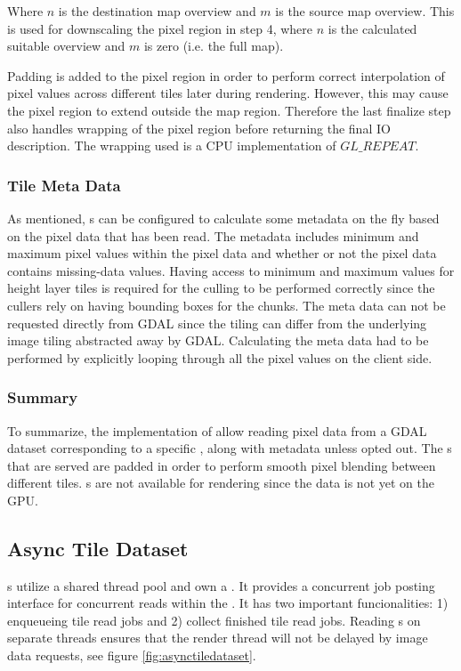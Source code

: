 Where $n$ is the destination map overview and $m$ is the source map overview. This is used for downscaling the pixel region in step 4, where $n$ is the calculated suitable overview and $m$ is zero (i.e. the full map). 

Padding is added to the pixel region in order to perform correct interpolation of pixel values across different tiles later during rendering. However, this may cause the pixel region to extend outside the map region. Therefore the last finalize step also handles wrapping of the pixel region before returning the final IO description. The wrapping used is a CPU implementation of $GL\_REPEAT$.

\subsubsection{Tile Meta Data}
As mentioned, s can be configured to calculate some metadata on the fly based on the pixel data that has been read. The metadata includes minimum and maximum pixel values within the pixel data and whether or not the pixel data contains missing-data values. Having access to minimum and maximum values for height layer tiles is required for the culling to be performed correctly since the cullers rely on having bounding boxes for the chunks. The meta data can not be requested directly from GDAL since the tiling can differ from the underlying image tiling abstracted away by GDAL. Calculating the meta data had to be performed by explicitly looping through all the pixel values on the client side. 

\subsubsection{Summary}
To summarize, the implementation of  allow reading pixel data from a GDAL dataset corresponding to a specific , along with metadata unless opted out. The s that are served are padded in order to perform smooth pixel blending between different tiles. s are not available for rendering since the data is not yet on the GPU.

\subsection{Async Tile Dataset}
s utilize a shared thread pool and own a . It provides a concurrent job posting interface for concurrent reads within the . It has two important funcionalities: 1) enqueueing tile read jobs and 2) collect finished tile read jobs. Reading s on separate threads ensures that the render thread will not be delayed by image data requests, see figure \ref{fig:asynctiledataset}.

